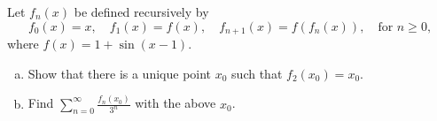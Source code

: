 Let $f_n(x)$ be defined recursively by
$$ f_0(x) = x, \quad f_1(x) = f(x), \quad f_{n+1}(x) = f(f_n(x)), \quad \text{for } n \ge 0, $$
where $f(x) = 1 + \sin(x - 1)$.

\begin{enumerate}[(a)]
\item Show that there is a unique point $x_0$ such that $f_2(x_0) = x_0$.
\item Find $\displaystyle{\sum_{n=0}^{\infty} \frac{f_n(x_0)}{3^n}}$ with the above $x_0$.
\end{enumerate}
